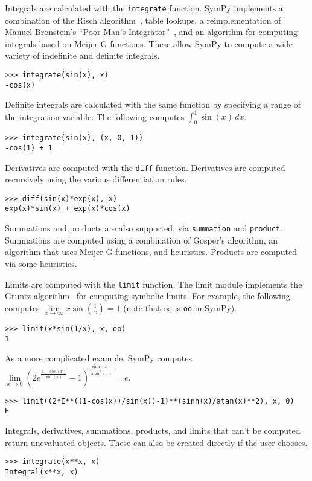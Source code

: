 Integrals are calculated with the \verb|integrate| function. SymPy
implements a combination of the Risch
algorithm~\cite{bronstein2005integration}, table lookups, a reimplementation
of Manuel Bronstein's ``Poor Man's Integrator''~\cite{Bronstein2005pmint}, and
an algorithm for computing integrals based on Meijer G-functions. These allow
SymPy to compute a wide variety of indefinite and definite integrals.
\begin{verbatim}
>>> integrate(sin(x), x)
-cos(x)
\end{verbatim}
Definite integrals are calculated with the same function by specifying a
range of the integration variable. The following computes $\int_0^1\sin(x)\,dx$.
\begin{verbatim}
>>> integrate(sin(x), (x, 0, 1))
-cos(1) + 1
\end{verbatim}

Derivatives are computed with the \verb|diff| function. Derivatives are
computed recursively using the various differentiation rules.
\begin{verbatim}
>>> diff(sin(x)*exp(x), x)
exp(x)*sin(x) + exp(x)*cos(x)
\end{verbatim}

Summations and products are also supported, via \verb|summation| and
\verb|product|. Summations are computed using a combination of Gosper's
algorithm, an algorithm that uses Meijer G-functions, and heuristics. Products
are computed via some heuristics.

Limits are computed with the \verb|limit| function. The limit module
implements the Gruntz algorithm~\cite{Gruntz1996limits} for computing symbolic
limits. For example, the following computes
$\lim\limits_{x\to \infty} x\sin(\frac{1}{x})=1$ (note that $\infty$ is
\verb|oo| in SymPy).
\begin{verbatim}
>>> limit(x*sin(1/x), x, oo)
1
\end{verbatim}
As a more complicated example, SymPy computes $\lim\limits_{x\to 0}{\left(2 e^{\frac{1 - \cos{\left (x \right )}}{\sin{\left (x \right )}}} -
  1\right)}^{\frac{\sinh{\left (x \right )}}{\operatorname{atan}^{2}{\left (x
      \right )}}} = e$.
\begin{verbatim}
>>> limit((2*E**((1-cos(x))/sin(x))-1)**(sinh(x)/atan(x)**2), x, 0)
E
\end{verbatim}

Integrals, derivatives, summations, products, and limits that can't be
computed return unevaluated objects. These can also be created directly if the
user chooses.
\begin{verbatim}
>>> integrate(x**x, x)
Integral(x**x, x)
\end{verbatim}
